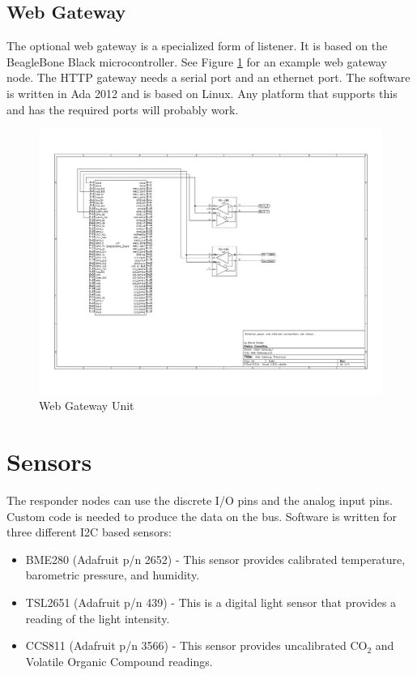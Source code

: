 \documentclass[10pt]{article}
\begin{document}
\subsection{Web Gateway}
The optional web gateway is a specialized form of listener.  It is based on the BeagleBone Black microcontroller.  See Figure \ref{fig:gateway} for an example web gateway node.  The HTTP gateway needs a serial port and an ethernet port.  The software is written in Ada 2012 and is based on Linux.  Any platform that supports this and has the required ports will probably work.

\begin{figure}
  \centering
  \includegraphics[width=\textwidth]{WebGateway.pdf}
  \caption{Web Gateway Unit}
  \label{fig:gateway}
\end{figure}



\section{Sensors}
The responder nodes can use the discrete I/O pins and the analog input pins.  Custom code is needed to produce the data on the bus.  Software is written for three different I2C based sensors:

\begin{itemize}
  \item BME280 (Adafruit p/n 2652) - This sensor provides calibrated temperature, barometric pressure, and humidity.
  \item TSL2651 (Adafruit p/n 439) - This is a digital light sensor that provides a reading of the light intensity.
  \item CCS811 (Adafruit p/n 3566) - This sensor provides uncalibrated CO$_2$ and Volatile Organic Compound readings.
\end{itemize}
\end{document}
